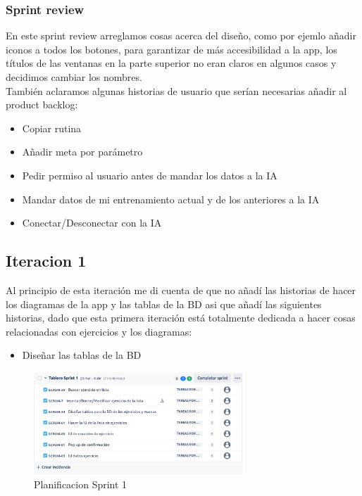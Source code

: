 \clearpage
\subsubsection{Sprint review}
En este sprint review arreglamos cosas acerca del diseño, como por ejemlo añadir iconos a todos los botones, para garantizar de más accesibilidad a la app, los títulos de las ventanas en la parte superior no eran claros en algunos casos y decidimos cambiar los nombres.\\

También aclaramos algunas historias de usuario que serían necesarias añadir al product backlog:
\begin{itemize}
	\item Copiar rutina
	\item Añadir meta por parámetro
	\item Pedir permiso al usuario antes de mandar los datos a la IA
	\item Mandar datos de mi entrenamiento actual y de los anteriores a la IA
	\item Conectar/Desconectar con la IA
\end{itemize}

\subsection{Iteracion 1}
Al principio de esta iteración me di cuenta de que no añadí las historias de hacer los diagramas de la app y las tablas de la BD asi que añadí las siguientes historias, dado que esta primera iteración está totalmente dedicada a hacer cosas relacionadas con ejercicios y los diagramas:
\begin{itemize}
	\item Diseñar las tablas de la BD
\end{itemize}

\begin{figure}[h!]
  \centering
  \includegraphics[width=0.7\textwidth]{fotos/PreSrprint1.png}
  \caption{Planificacion Sprint 1}
  \label{fig:imagen}
\end{figure}

